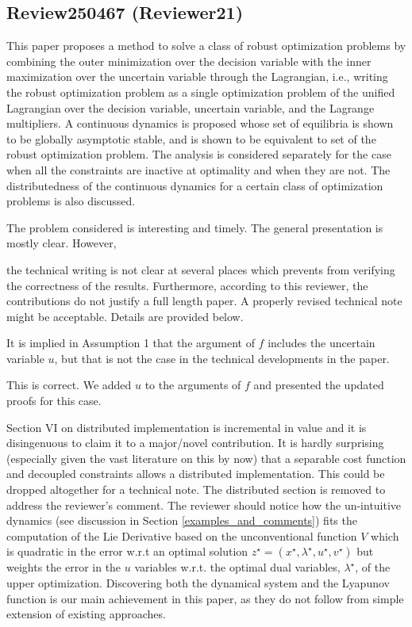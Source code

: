 \documentclass[journal,twoside,web]{ieeecolor}
\begin{document}
\subsection{Review250467 (Reviewer21)}

This paper proposes a method to solve a class of robust optimization problems by combining the outer minimization over the decision variable with the inner maximization over the uncertain variable through the Lagrangian, i.e.,  writing the robust optimization problem as a single optimization problem of the unified Lagrangian over the decision variable, uncertain variable, and the Lagrange multipliers. A continuous dynamics is proposed whose set of equilibria is shown to be globally asymptotic stable, and is shown to be equivalent to set of the robust optimization problem. The analysis is considered separately for the case when all the constraints are inactive at optimality and when they are not. The distributedness of the continuous dynamics for a certain class of optimization problems is also discussed.

The problem considered is interesting and timely. The general presentation is mostly clear. However, {\color{red}the technical writing is not clear at several places which prevents from verifying the correctness of the results. Furthermore, according to this reviewer, the contributions do not justify a full length paper. A properly revised technical note might be acceptable. Details are provided below.

It is implied in Assumption 1 that the argument of $f$ includes the uncertain variable $u$, but that is not the case in the technical developments in the paper.} {\color{blue}This is correct. We added $u$ to the arguments of $f$ and presented the updated proofs for this case.}

Section VI on distributed implementation is incremental in value and it is disingenuous to claim it to a major/novel contribution. It is hardly surprising (especially given the vast literature on this by now) that a separable cost function and decoupled constraints allows a distributed implementation. This could be dropped altogether for a technical note. {\color{blue}The distributed section is removed to address the reviewer's comment. The reviewer should notice how the un-intuitive dynamics (see discussion in Section \ref{examples_and_comments}) fits the computation of the Lie Derivative based on the unconventional function $V$ which is quadratic in the error w.r.t an optimal solution $z^\star=(x^\star,\lambda^\star,u^\star,v^\star)$ but weights the error in the $u$ variables w.r.t. the optimal dual variables, $\lambda^\star$, of the upper optimization. Discovering both the dynamical system and the Lyapunov function is our main achievement in this paper, as they do not follow from simple extension of existing approaches.}
\end{document}
